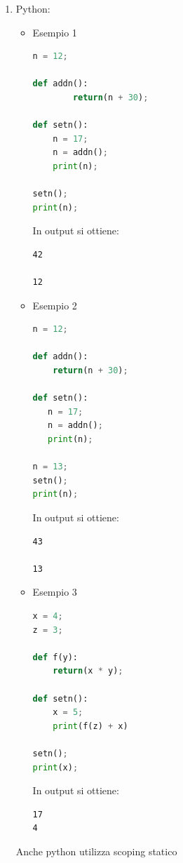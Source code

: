 \documentclass[a4paper]{article}
\begin{document}
\begin{Example}{}{}
\begin{enumerate}
\begin{itemize}
\begin{lstlisting}
function setn() {
    var n = 17;
    n = addn();
    console.log(n + '\n');
}

setn();

console.log(n);
\end{lstlisting}
          In output si ottiene:
\begin{lstlisting}
42

12
\end{lstlisting}
          Da questo esempio si nota che JavaScript utilizza scoping statico
      \end{itemize}

    \item Python:
      \begin{itemize}
        \item Esempio 1
\begin{lstlisting}[language=Python]
n = 12;

def addn():
        return(n + 30);

def setn():
    n = 17;
    n = addn();
    print(n);

setn();
print(n);
\end{lstlisting}
          In output si ottiene:
\begin{lstlisting}
42

12
\end{lstlisting}

        \item Esempio 2
\begin{lstlisting}[language=Python]
n = 12;

def addn():
    return(n + 30);

def setn():
   n = 17;
   n = addn();
   print(n);

n = 13;
setn();
print(n);
\end{lstlisting}
          In output si ottiene:
\begin{lstlisting}
43

13
\end{lstlisting}

        \item Esempio 3
\begin{lstlisting}[language=Python]
x = 4;
z = 3;

def f(y):
    return(x * y);

def setn():
    x = 5;
    print(f(z) + x)

setn();
print(x);
\end{lstlisting}
          In output si ottiene:
\begin{lstlisting}
17
4
\end{lstlisting}
      \end{itemize}
      Anche python utilizza scoping statico
  \end{enumerate}
\end{Example}
\end{document}
